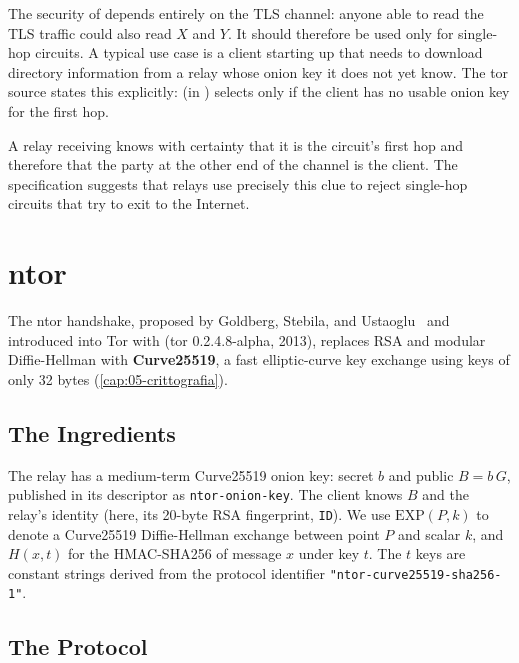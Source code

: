 The security of  depends entirely on the TLS channel: anyone able to read the TLS traffic could also read $X$ and $Y$. It should therefore be used only for single-hop circuits. A typical use case is a client starting up that needs to download directory information from a relay whose onion key it does not yet know. The tor source states this explicitly:  (in ) selects  only if the client has no usable onion key for the first hop.

\begin{attenzione}
A relay receiving  knows with certainty that it is the circuit's first hop and therefore that the party at the other end of the channel is the client. The specification suggests that relays use precisely this clue to reject single-hop circuits that try to exit to the Internet.
\end{attenzione}

\section{ntor}\label{sec:ntor}

The ntor handshake, proposed by Goldberg, Stebila, and Ustaoglu~\cite{goldberg2013ntor} and introduced into Tor with  (tor 0.2.4.8-alpha, 2013), replaces RSA and modular Diffie-Hellman with \textbf{Curve25519}, a fast elliptic-curve key exchange using keys of only 32 bytes (\cref{cap:05-crittografia}).

\subsection{The Ingredients}

The relay has a medium-term Curve25519 onion key: secret $b$ and public $B = b\,G$, published in its descriptor as \texttt{ntor-onion-key}. The client knows $B$ and the relay's identity (here, its 20-byte RSA fingerprint, \texttt{ID}). We use $\mathrm{EXP}(P, k)$ to denote a Curve25519 Diffie-Hellman exchange between point $P$ and scalar $k$, and $H(x, t)$ for the HMAC-SHA256 of message $x$ under key $t$. The $t$ keys are constant strings derived from the protocol identifier \texttt{"ntor-curve25519-sha256-1"}.

\subsection{The Protocol}

